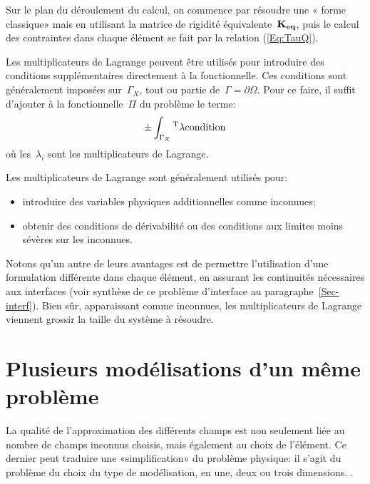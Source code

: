 \medskip
Sur le plan du déroulement du calcul, on commence par résoudre une « forme classique» mais en utilisant la matrice de rigidité équivalente~$\MM{K_{eq}}$, puis le calcul des contraintes dans chaque élément se fait par la relation (\ref{Eq:TauQ}).


\bigskip
Les multiplicateurs de Lagrange peuvent être utilisés pour introduire des conditions supplémentaires directement à la fonctionnelle.
Ces conditions sont généralement imposées sur~$\Gamma_X$, tout ou partie de~$\Gamma=\partial\Omega$. Pour ce faire, il suffit d'ajouter à la fonctionnelle~$\Pi$ du problème le terme:
\begin{equation}
  \pm\dint_{\Gamma_X} \LL{\lambda}\VV{\text{condition}}
\end{equation}
où les~$\lambda_i$ sont les multiplicateurs de Lagrange.

\medskip
Les multiplicateurs de Lagrange sont généralement utilisés pour:
\begin{itemize}
  \item introduire des variables physiques additionnelles comme inconnues;
  \item obtenir des conditions de dérivabilité ou des conditions aux
     limites moins sévères sur les inconnues.
\end{itemize}

\medskip
Notons qu'un autre de leurs avantages est de permettre l'utilisation d'une formulation différente dans chaque élément, en assurant les continuités nécessaires aux interfaces (voir synthèse de ce problème d'interface au paragraphe~\ref{Sec-interf}). Bien sûr, apparaissant comme inconnues, les multiplicateurs de Lagrange viennent grossir la taille du système à résoudre.



\medskip
\section{Plusieurs modélisations d'un même problème}\label{Sec-PlusModel}

La qualité de l'approximation des différents champs est non seulement liée au nombre de champs inconnus choisis, mais également au choix de l'élément. Ce dernier peut traduire une «simplification» du problème physique: il s'agit du problème du choix du type de modélisation, en une, deux ou trois dimensions.
.

